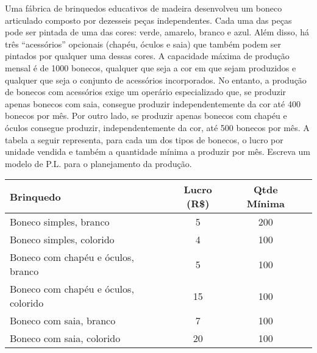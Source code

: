 \documentclass[12pt]{article}
\begin{document}
%
\begin{tcolorbox}[rounded corners, colback=yellow!5, colframe=red!40!black, title=\textbf{Descrição do problema P-\myprob}]
Uma fábrica de brinquedos educativos de madeira desenvolveu um boneco articulado composto por dezesseis peças independentes. Cada uma das peças pode ser pintada de uma das cores: verde, amarelo,
branco e azul. Além disso, há três “acessórios” opcionais (chapéu, óculos e saia) que também podem
ser pintados por qualquer uma dessas cores. A capacidade máxima de produção mensal é de 1000
bonecos, qualquer que seja a cor em que sejam produzidos e qualquer que seja o conjunto de acessórios
incorporados. No entanto, a produção de bonecos com acessórios exige um operário especializado que,
se produzir apenas bonecos com saia, consegue produzir independentemente da cor até 400 bonecos
por mês. Por outro lado, se produzir apenas bonecos com chapéu e óculos consegue produzir, independentemente da cor, até 500 bonecos por mês. A tabela a seguir representa, para cada um dos tipos de
bonecos, o lucro por unidade vendida e também a quantidade mínima a produzir por mês. Escreva um
modelo de P.L. para o planejamento da produção.  \begin{center}\small
   \begin{tabular}{lccc}
    \cmidrule{4-4}
    \midrule
    Brinquedo & Lucro (R\$) & Qtde Mínima \\
    \midrule
     Boneco simples, branco               & 5       & 200 \\
     Boneco simples, colorido             & 4       & 100 \\
     Boneco com chapéu e óculos, branco   & 5       & 100 \\
     Boneco com chapéu e óculos, colorido & 15      & 100 \\
     Boneco com saia, branco              & 7       & 100 \\
     Boneco com saia, colorido            & 20      & 100 \\
    \bottomrule
   \end{tabular}
  \end{center}
\end{tcolorbox}\bigskip
\end{document}
